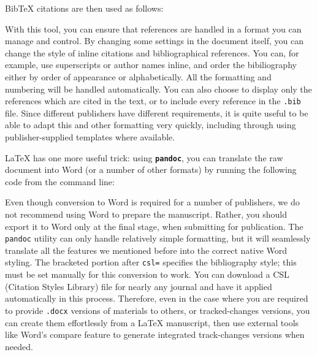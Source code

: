
\noindent BibTeX citations are then used as follows:


With this tool, you can ensure that references are handled
in a format you can manage and control.\cite{flom2005latex}
By changing some settings in the document itself,
you can change the style of inline citations and bibliographical references.
You can, for example, use superscripts or author names inline,
and order the bibiliography either by order of appearance or alphabetically.
All the formatting and numbering will be handled automatically.
You can also choose to display only the references which are cited in the text,
or to include every reference in the \texttt{.bib} file.
Since different publishers have different requirements,
it is quite useful to be able to adapt this and other formatting very quickly,
including through using publisher-supplied templates where available.

{\LaTeX} has one more useful trick:
using \textbf{\texttt{pandoc}},
you can translate the raw document into Word
(or a number of other formats)
by running the following code from the command line:


\noindent Even though conversion to Word is required for a number of publishers,
we do not recommend using Word to prepare the manuscript. 
Rather, you should export it to Word only at the final stage, when submitting for publication.
The \texttt{pandoc} utility can only handle relatively simple formatting,
but it will seamlessly translate all the features we mentioned before
into the correct native Word styling.
The bracketed portion after \texttt{csl=} specifies the bibliography style;
this must be set manually for this conversion to work.
You can download a CSL (Citation Styles Library) file
for nearly any journal and have it applied automatically in this process.
Therefore, even in the case where you are required to provide
\texttt{.docx} versions of materials to others, or tracked-changes versions,
you can create them effortlessly from a {\LaTeX} manuscript,
then use external tools like Word's compare feature
to generate integrated track-changes versions when needed.



